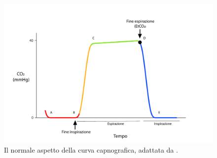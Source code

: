 \begin{figure}[h]
    \centering
    \includegraphics[width=1\textwidth]{Figure/capnopdf.pdf}
    \caption{Il normale aspetto della curva capnografica, adattata da \cite{Baruch2005}.}
    \label{fig:curvacapno}
\end{figure}